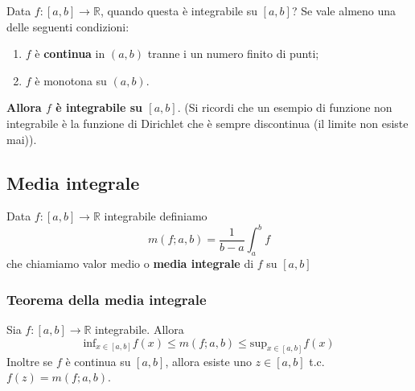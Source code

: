\documentclass[x11names]{article}
\begin{document}
	Data $f: [a,b] \to \mathbb{R}$, quando questa è integrabile su $[a,b]$? Se vale almeno una delle seguenti condizioni:
	\begin{enumerate}
		\item $f$ è \textbf{continua} in $(a,b)$ tranne i un numero finito di punti;
		\item $f$ è monotona su $(a,b)$.
	\end{enumerate}
	\textbf{Allora $f$ è integrabile su $[a,b]$}. (Si ricordi che un esempio di funzione non integrabile è la funzione di Dirichlet che è sempre discontinua (il limite non esiste mai)).
	
	\subsection{Media integrale}
	Data $f: [a,b] \to \mathbb{R}$ integrabile definiamo
	\[
	m(f;a,b) = \frac{1}{b-a}\int_{a}^{b}f 
	\]
	che chiamiamo valor medio o \textbf{media integrale} di $f$ su $[a,b]$
	\begin{center}
		\colorbox{myred}{\begin{minipage}{5.75in}
				\begin{redes}{}
					\subsubsection{Teorema della media integrale}
					Sia $f: [a,b] \to \mathbb{R}$ integrabile. Allora
					\[
					\text{inf}_{x \in [a,b]} f(x) \leq m(f;a,b) \leq \text{sup}_{x \in [a,b]} f(x)
					\]					
					Inoltre se $f$ è continua su $[a,b]$, allora esiste uno $z \in [a,b]$ t.c. $f(z) = m(f;a,b)$.
				\end{redes}
		\end{minipage}}        
	\end{center}
	
\end{document}
